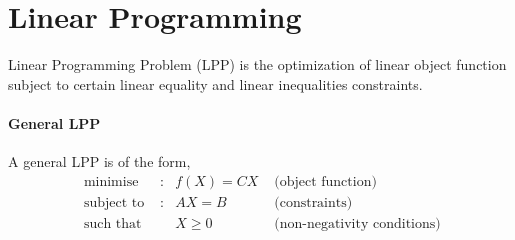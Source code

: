 

\section{Linear Programming}
\begin{definition}[LPP]
Linear Programming Problem (LPP) is the optimization of linear object function subject to certain linear equality and linear inequalities constraints.
\end{definition}
\paragraph{General LPP}
A general LPP is of the form,
\begin{align}
\text{ minimise } & : & f(X) = CX  & \text{ (object function)} \label{eqn:obj} \\
\text{ subject to } & : & AX = B & \text{ (constraints)}\label{eqn:sub} \\
\text{ such that } & & X \ge 0 & \text{ (non-negativity conditions)}\label{eqn:positive}
\end{align}

